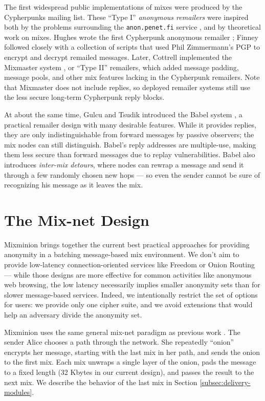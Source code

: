 \documentclass[11pt]{IEEEtran}
\begin{document}
The first widespread public implementations of mixes were produced by the
Cypherpunks mailing list. These ``Type I'' \emph{anonymous remailers}
were inspired both by the problems surrounding the {\tt anon.penet.fi}
service \cite{helsingius}, and by theoretical work on mixes. Hughes wrote
the first Cypherpunk anonymous remailer \cite{remailer-history}; Finney
followed closely with a collection of scripts that used Phil Zimmermann's
PGP to encrypt and decrypt remailed messages. Later, Cottrell implemented
the Mixmaster system \cite{mixmaster}\cite{mixmaster-spec}, or ``Type II'' remailers,
which added message padding, message pools, and other mix features lacking
in the Cypherpunk remailers. Note that Mixmaster does not include replies,
so deployed remailer systems still use the less secure
long-term Cypherpunk reply blocks.

At about the same time, Gulcu and Tsudik introduced the Babel
system \cite{babel}, a practical remailer design with many desirable
features. While it provides replies, they are only indistinguishable
from forward messages by passive observers; the mix nodes can still
distinguish. Babel's reply addresses are multiple-use, making them less
secure than forward messages due to replay vulnerabilities. Babel also
introduces \emph{inter-mix detours}, where nodes can rewrap a message
and send it through a few randomly chosen new hops --- so even the sender
cannot be sure of recognizing his message as it leaves the mix.


\section{The Mix-net Design}
\label{sec:design}

Mixminion brings together the current best practical approaches for providing
anonymity in a batching message-based mix environment. We don't aim
to provide low-latency connection-oriented services like Freedom
\cite{freedom} or Onion Routing \cite{goldschlag99} --- while those
designs are more effective for common activities like anonymous web
browsing, the low latency necessarily implies smaller anonymity sets
than for slower message-based services. Indeed, we intentionally
restrict the set of options for users: we provide only one
cipher suite, and we avoid extensions that would help an adversary
divide the anonymity set.

Mixminion uses the same general mix-net paradigm as previous work
\cite{chaum-mix}\cite{mixmaster-attacks}\cite{babel}. The sender Alice chooses a
path through the network. She repeatedly ``onion'' encrypts her message,
starting with the last
mix in her path, and sends the onion to the first mix. Each
mix unwraps a single layer of the onion, pads the message to a fixed
length (32 Kbytes in our current design), and passes the result to the
next mix. We describe the behavior of the last mix in
Section \ref{subsec:delivery-modules}.
\end{document}
